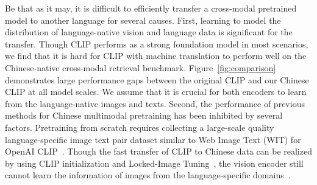 Be that as it may, it is difficult to efficiently transfer a cross-modal pretrained model to another language for several causes. 
First, learning to model the distribution of language-native vision and language data is significant for the transfer. 
Though CLIP performs as a strong foundation model in most scenarios, we find that it is hard for CLIP with machine translation to perform well on the Chinese-native cross-modal retrieval benchmark.
Figure~\ref{fig:comparison} demonstrates large performance gaps between the original CLIP and our Chinese CLIP at all model scales. 
We assume that it is crucial for both encoders to learn from the language-native images and texts. 
Second, the performance of previous methods for Chinese multimodal pretraining has been inhibited by several factors. Pretraining from scratch requires collecting a large-scale quality language-specific image text pair dataset similar to Web Image Text (WIT) for OpenAI CLIP~\citep{wenlan, r2d2}. Though the fast transfer of CLIP to Chinese data can be realized by using CLIP initialization and Locked-Image Tuning~\citep{lit}, the vision encoder still cannot learn the information of images from the language-specific domains~\citep{wukong}. 


